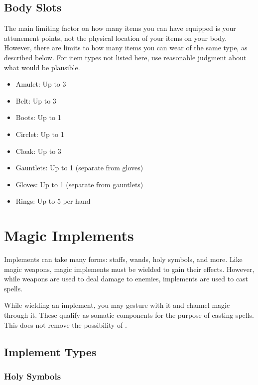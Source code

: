     \subsection{Body Slots}
        The main limiting factor on how many items you can have equipped is your attunement points, not the physical location of your items on your body.
        However, there are limits to how many items you can wear of the same type, as described below.
        For item types not listed here, use reasonable judgment about what would be plausible.
        \begin{itemize}
            \item Amulet: Up to 3
            \item Belt: Up to 3
            \item Boots: Up to 1
            \item Circlet: Up to 1
            \item Cloak: Up to 3
            \item Gauntlets: Up to 1 (separate from gloves)
            \item Gloves: Up to 1 (separate from gauntlets)
            \item Rings: Up to 5 per hand
        \end{itemize}

    

    

\newpage
\section{Magic Implements}\label{Implements}
    Implements can take many forms: staffs, wands, holy symbols, and more.
    Like magic weapons, magic implements must be wielded to gain their effects.
    However, while weapons are used to deal damage to enemies, implements are used to cast spells.

     While wielding an implement, you may gesture with it and channel magic through it.
    These qualify as somatic components for the purpose of casting spells.
    This does not remove the possibility of .

    \subsection{Implement Types}

        \subsubsection{Holy Symbols}

